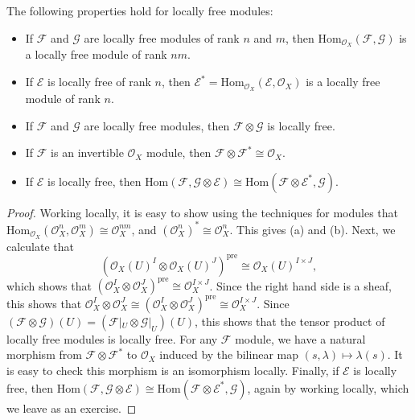 \begin{theorem}
    The following properties hold for locally free modules:
    \begin{itemize}
        \item If $\mathcal{F}$ and $\mathcal{G}$ are locally free modules of rank $n$ and $m$, then $\text{Hom}_{\mathcal{O}_X}(\mathcal{F},\mathcal{G})$ is a locally free module of rank $nm$.

        \item If $\mathcal{E}$ is locally free of rank $n$, then $\mathcal{E}^* = \text{Hom}_{\mathcal{O}_X}(\mathcal{E},\mathcal{O}_X)$ is a locally free module of rank $n$.

        \item If $\mathcal{F}$ and $\mathcal{G}$ are locally free modules, then $\mathcal{F} \otimes \mathcal{G}$ is locally free.

        \item If $\mathcal{F}$ is an invertible $\mathcal{O}_X$ module, then $\mathcal{F} \otimes \mathcal{F}^* \cong \mathcal{O}_X$.

        \item If $\mathcal{E}$ is locally free, then $\text{Hom}(\mathcal{F},\mathcal{G} \otimes \mathcal{E}) \cong \text{Hom}(\mathcal{F} \otimes \mathcal{E}^*, \mathcal{G})$.
    \end{itemize}
\end{theorem}
\begin{proof}
    Working locally, it is easy to show using the techniques for modules that $\text{Hom}_{\mathcal{O}_X}(\mathcal{O}_X^n, \mathcal{O}_X^m) \cong \mathcal{O}_X^{nm}$, and $(\mathcal{O}_X^n)^* \cong \mathcal{O}_X^n$. This gives (a) and (b). Next, we calculate that
    \[ (\mathcal{O}_X(U)^I \otimes \mathcal{O}_X(U)^J)^{\text{pre}} \cong \mathcal{O}_X(U)^{I \times J}, \]
    which shows that $(\mathcal{O}_X^I \otimes \mathcal{O}_X^J)^{\text{pre}} \cong \mathcal{O}_X^{I \times J}$. Since the right hand side is a sheaf, this shows that $\mathcal{O}_X^I \otimes \mathcal{O}_X^J \cong (\mathcal{O}_X^I \otimes \mathcal{O}_X^J)^{\text{pre}} \cong \mathcal{O}_X^{I \times J}$. Since $(\mathcal{F} \otimes \mathcal{G})(U) = (\mathcal{F}|_U \otimes \mathcal{G}|_U)(U)$, this shows that the tensor product of locally free modules is locally free. For any $\mathcal{F}$ module, we have a natural morphism from $\mathcal{F} \otimes \mathcal{F}^*$ to $\mathcal{O}_X$ induced by the bilinear map $(s, \lambda) \mapsto \lambda(s)$. It is easy to check this morphism is an isomorphism locally. Finally, if $\mathcal{E}$ is locally free, then $\text{Hom}(\mathcal{F}, \mathcal{G} \otimes \mathcal{E}) \cong \text{Hom}(\mathcal{F} \otimes \mathcal{E}^*, \mathcal{G})$, again by working locally, which we leave as an exercise.
\end{proof}

